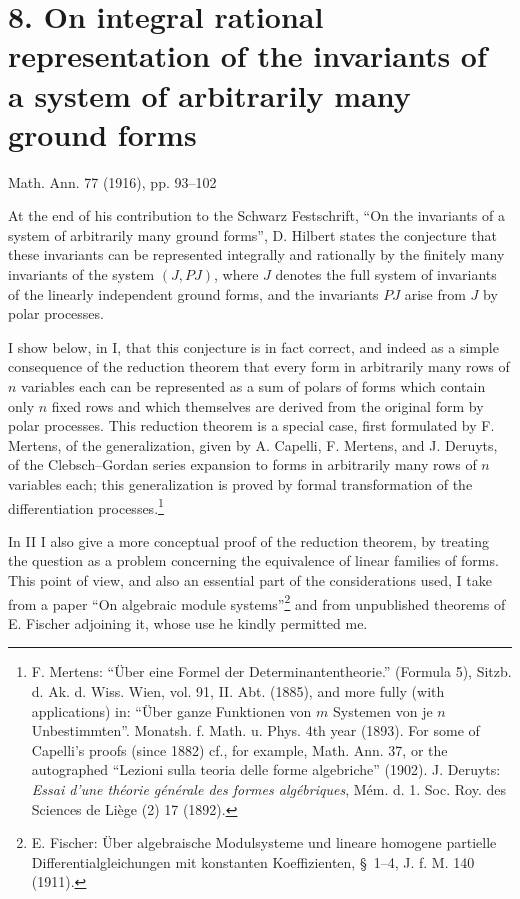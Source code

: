 \section*{8. On integral rational representation of the invariants of a system of arbitrarily many ground forms}
\begin{center}
Math. Ann. 77 (1916), pp. 93--102
\end{center}

At the end of his contribution to the Schwarz Festschrift, ``On the invariants of a system of arbitrarily many ground forms'', D. Hilbert states the conjecture that these invariants can be represented integrally and rationally by the finitely many invariants of the system $(J,PJ)$, where $J$ denotes the full system of invariants of the linearly independent ground forms, and the invariants $PJ$ arise from $J$ by polar processes.

I show below, in I, that this conjecture is in fact correct, and indeed as a simple consequence of the reduction theorem that every form in arbitrarily many rows of $n$ variables each can be represented as a sum of polars of forms which contain only $n$ fixed rows and which themselves are derived from the original form by polar processes. This reduction theorem is a special case, first formulated by F. Mertens, of the generalization, given by A. Capelli, F. Mertens, and J. Deruyts, of the Clebsch--Gordan series expansion to forms in arbitrarily many rows of $n$ variables each; this generalization is proved by formal transformation of the differentiation processes.\footnote{F. Mertens: ``Über eine Formel der Determinantentheorie.'' (Formula 5), Sitzb. d. Ak. d. Wiss. Wien, vol. 91, II. Abt. (1885), and more fully (with applications) in: ``Über ganze Funktionen von $m$ Systemen von je $n$ Unbestimmten''. Monatsh. f. Math. u. Phys. 4th year (1893). For some of Capelli's proofs (since 1882) cf., for example, Math. Ann. 37, or the autographed ``Lezioni sulla teoria delle forme algebriche'' (1902). J. Deruyts: \emph{Essai d'une théorie générale des formes algébriques}, Mém. d. 1. Soc. Roy. des Sciences de Liège (2) 17 (1892).}

In II I also give a more conceptual proof of the reduction theorem, by treating the question as a problem concerning the equivalence of linear families of forms. This point of view, and also an essential part of the considerations used, I take from a paper ``On algebraic module systems''\footnote{E. Fischer: Über algebraische Modulsysteme und lineare homogene partielle Differentialgleichungen mit konstanten Koeffizienten, \S\ 1--4, J. f. M. 140 (1911).} and from unpublished theorems of E. Fischer adjoining it, whose use he kindly permitted me.

